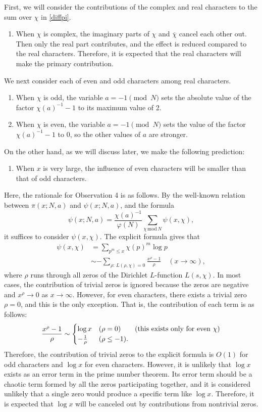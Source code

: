 \documentclass[12pt,reqno]{amsart}
\theoremstyle{definition}
\theoremstyle{remark}
\numberwithin{equation}{section}
\begin{document}
First, we will consider the contributions of the complex and real characters to the sum over $\chi$ in \eqref{diffpi}.
\begin{enumerate}[\bf{Observation} 1.]
\item When $\chi$ is complex, the imaginary parts of $\chi$ and $\overline\chi$ cancel each other out.
Then only the real part contributes, and the effect is reduced compared to the real characters.
Therefore, it is expected that the real characters will make the primary contribution.
\end{enumerate}
We next consider each of even and odd characters among real characters.
\begin{enumerate}[\bf{Observation} 1.]\setcounter{enumi}1
\item When $\chi$ is odd, the variable $a=-1\pmod N$ sets the absolute value of the factor 
$\chi(a)^{-1}-1$ to its maximum value of 2.
\item When $\chi$ is even, the variable $a=-1\pmod N$ sets the value of the factor $\chi(a)^{-1}-1$ to 0, 
so the other values of $a$ are stronger.
\end{enumerate}
On the other hand, as we will discuss later, we make the following prediction:
\begin{enumerate}[\bf{Observation} 1.]\setcounter{enumi}3
\item When $x$ is very large, the influence of even characters will be smaller than that of odd characters.
\end{enumerate}
Here, the rationale for Observation 4 is as follows.
By the well-known relation between $\pi(x;N,a)$ and $\psi(x;N,a)$, and the formula
\[
\psi(x;N,a)=\frac{\chi(a)^{-1}}{\varphi(N)}\sum_{\chi\,\mathrm{mod}\,N}\psi(x,\chi),
\]
it suffices to consider $\psi(x,\chi)$.
The explicit formula gives that
\begin{align*}
\psi(x,\chi)
&=\sum_{p^m\le x}\chi(p)^m\log p\\
&\sim -\sum_{\rho:\,L(\rho,\chi)=0}\frac{x^\rho-1}\rho\quad (x\to\infty),
\end{align*}
where $\rho$ runs through all zeros of the Dirichlet $L$-function $L(s,\chi)$.
In most cases, the contribution of trivial zeros is ignored because the zeros are negative and $x^\rho\to 0$ as $x\to\infty$. However, for even characters, there exists a trivial zero $\rho=0$, and this is the only exception. 
That is, the contribution of each term is as follows:
\[
\frac{x^\rho-1}\rho\sim \begin{cases}
\log x &(\rho=0)\text{\qquad (this exists only for even $\chi$)}\\
-\frac1\rho & (\rho\le -1).
\end{cases}
\]
Therefore, the contribution of trivial zeros to the explicit formula is $O(1)$ for odd characters and $\log x$ for even characters.
However, it is unlikely that $\log x$ exists as an error term in the prime number theorem. 
Its error term should be a chaotic term formed by all the zeros participating together, 
and it is considered unlikely that a single zero would produce a specific term like $\log x$.
Therefore, it is expected that $\log x$ will be canceled out by contributions from nontrivial zeros.
\end{document}
